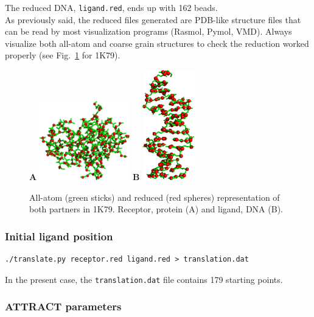 \documentclass[12pt,a4paper]{article}
\begin{document}
The reduced DNA, {\tt ligand.red}, ends up with 162 beads. \\

As previously said, the reduced files generated are PDB-like structure files 
that can be read by most visualization programs (Rasmol, Pymol, VMD). 
Always visualize both all-atom and coarse grain structures to check the 
reduction worked properly (see Fig.~\ref{1K79_at_cg} for 1K79).

\begin{figure}[htbp]
\center
{\textbf A}
\includegraphics*[width=0.35\textwidth]{img/1K79_receptor.png}
\hspace*{2cm}
{\textbf B}
\includegraphics*[width=0.20\textwidth]{img/1K79_ligand.png}
\caption{All-atom (green sticks) and reduced (red spheres) representation 
of both partners in 1K79. Receptor, protein (A) and ligand, DNA (B).}
\label{1K79_at_cg}
\end{figure}

\subsubsection{Initial ligand position}

\begin{verbatim}
./translate.py receptor.red ligand.red > translation.dat
\end{verbatim}

In the present case, the {\tt translation.dat} file contains 179 starting points.

\subsubsection{ATTRACT parameters}
\end{document}
